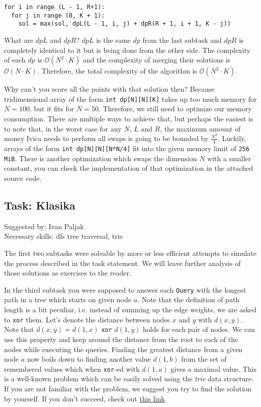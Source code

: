 \documentclass[a4paper]{article}
\begin{document}
\vspace{-2ex}
\begin{verbatim}
for i in range (L - 1, R+1):
  for j in range (0, K + 1):
    sol = max(sol, dpL(L - 1, i, j) + dpR(R + 1, i + 1, K - j))
\end{verbatim}

What are $dpL$ and $dpR$? $dpL$ is the same $dp$ from the last subtask and
$dpR$ is completely identical to it but is being done from the other side. The
complexity of each $dp$ is $\mathcal{O}(N^2 \cdot K)$ and the complexity of
merging their solutions is $\mathcal{O}(N \cdot K)$. Therefore, the total
complexity of the algorithm is $\mathcal{O}(N^2 \cdot K)$.

Why can't you score all the points with that solution then? Because tridimensional
array of the form \texttt{int dp[N][N][K]} takes up too much memory for $N = 100$, but it
fits for $N=50$. Therefore, we still need to optimize our memory consumption.
There are multiple ways to achieve that, but perhaps the easiest is to note that,
in the worst case for any $N$, $L$ and $R$, the maximum amount of money Ivica
needs to perform all swaps is going to be bounded by $\frac{N^2}{4}$. Luckily,
arrays of the form \texttt{int dp[N][N][N*N/4]} fit into the given memory limit
of \texttt{256 MiB}. There is another optimization which swaps the dimension $N$
with a smaller constant, you can check the implementation of that optimization
in the attached source code.

\subsection*{Task: Klasika}
\textsf{Suggested by: Ivan Paljak}\\
\textsf{Necessary skills: dfs tree traversal, trie}

The first two subtasks were solvable by more or less efficient attempts
to simulate the process described in the task statement. We will leave
further analysis of those solutions as exercises to the reader.

In the third subtask you were supposed to answer each \texttt{Query} with
the longest path in a tree which starts on given node $a$. Note that the
definition of path length is a bit peculiar, i.e. instead of summing up
the edge weights, we are asked to \texttt{xor} them. Let's denote the distance
between nodes $x$ and $y$ with $d(x,y)$. Note that $d(x, y) = d(1, x)$ \texttt{xor}
$d(1, y)$ holds for each pair of nodes. We can use this property and keep around
the distance from the root to each of the nodes while executing the queries.
Finding the greatest distance from a given node $a$ now boils down to finding
another value $d(1, b)$ from the set of remembered values which when \texttt{xor}-ed
with $d(1, a)$ gives a maximal value. This is a well-known problem which can be
easily solved using the \textit{trie} data structure. If you are not familiar with
the problem, we suggest you try to find the solution by yourself. If you don't
succeed, check out
 \href{https://www.hackerearth.com/practice/notes/lalitkundu95/tutorial-on-trie-and-example-problems/}{this link}.
\end{document}
